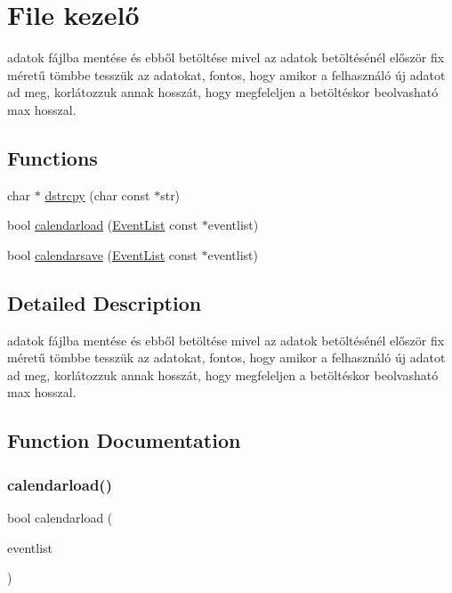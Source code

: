 \hypertarget{group__file}{}\section{File kezelő}
\label{group__file}


adatok fájlba mentése és ebből betöltése mivel az adatok betöltésénél először fix méretű tömbbe tesszük az adatokat, fontos, hogy amikor a felhasználó új adatot ad meg, korlátozzuk annak hosszát, hogy megfeleljen a betöltéskor beolvasható max hosszal.  


\subsection*{Functions}
\begin{DoxyCompactItemize}
\item 
char $\ast$ \hyperlink{group__file_ga91b52505951ff88321e947b6e1c4b779}{dstrcpy} (char const $\ast$str)
\item 
bool \hyperlink{group__file_gaf4efa1e078c7552b2f70daf3a40039c7}{calendarload} (\hyperlink{struct_event_list}{Event\+List} const $\ast$eventlist)
\item 
bool \hyperlink{group__file_ga7f69872489b7c1c4bcdd125319a87b2e}{calendarsave} (\hyperlink{struct_event_list}{Event\+List} const $\ast$eventlist)
\end{DoxyCompactItemize}


\subsection{Detailed Description}
adatok fájlba mentése és ebből betöltése mivel az adatok betöltésénél először fix méretű tömbbe tesszük az adatokat, fontos, hogy amikor a felhasználó új adatot ad meg, korlátozzuk annak hosszát, hogy megfeleljen a betöltéskor beolvasható max hosszal. 



\subsection{Function Documentation}
\mbox{\label{group__file_gaf4efa1e078c7552b2f70daf3a40039c7}} 
\subsubsection{\texorpdfstring{calendarload()}{calendarload()}}
{\footnotesize\ttfamily bool calendarload (\begin{DoxyParamCaption}\item[{\hyperlink{struct_event_list}{Event\+List} const $\ast$}]{eventlist }\end{DoxyParamCaption})}

